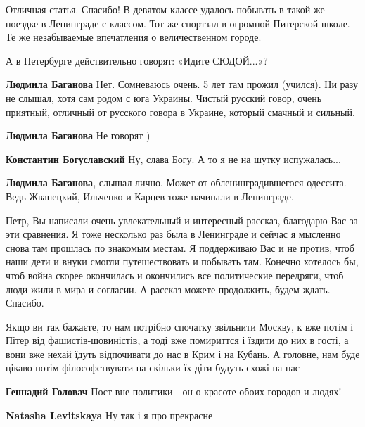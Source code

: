 \begin{itemize}

Отличная статья. Спасибо! В девятом классе удалось побывать в такой же поездке
в Ленинграде с классом. Тот же спортзал в огромной Питерской школе. Те же
незабываемые впечатления о величественном городе.


А в Петербурге действительно говорят: «Идите СЮДОЙ...»?

\begin{itemize} %
\textbf{Людмила Баганова}
Нет.
Сомневаюсь очень.
5 лет там прожил (учился). Ни разу не слышал, хотя сам родом с юга Украины.
Чистый русский говор, очень приятный, отличный от русского говора в Украине, который смачный и сильный.

\textbf{Людмила Баганова}
Не говорят )

\textbf{Константин Богуславский} Ну, слава Богу. А то я не на шутку испужалась...

\textbf{Людмила Баганова}, слышал лично. Может от обленинградившегося одессита. Ведь Жванецкий, Ильченко и Карцев тоже начинали в Ленинграде.
\end{itemize} %


Петр, Вы написали очень увлекательный и интересный рассказ, благодарю Вас за
эти сравнения. Я тоже несколько раз была в Ленинграде и сейчас я мысленно снова
там прошлась по знакомым местам. Я поддерживаю Вас и не против, чтоб наши дети
и внуки смогли путешествовать и побывать там. Конечно хотелось бы, чтоб война
скорее окончилась и окончились все политические передряги, чтоб люди жили в
мира и согласии. А рассказ можете продолжить, будем ждать. Спасибо.


Якщо ви так бажаєте, то нам потрібно спочатку звільнити Москву, к вже потім і
Пітер від фашистів-шовиністів, а тоді вже помириттся і їздити до них в гості, а
вони вже нехай їдуть відпочивати до нас в Крим і на Кубань. А головне, нам буде
цікаво потім філософствувати на скільки їх діти будуть схожі на нас

\begin{itemize} %
\textbf{Геннадий Головач}
Пост вне политики - он о красоте обоих городов и людях!

\textbf{Natasha Levitskaya}
Ну так і я про прекрасне


\end{itemize}
\end{itemize}
